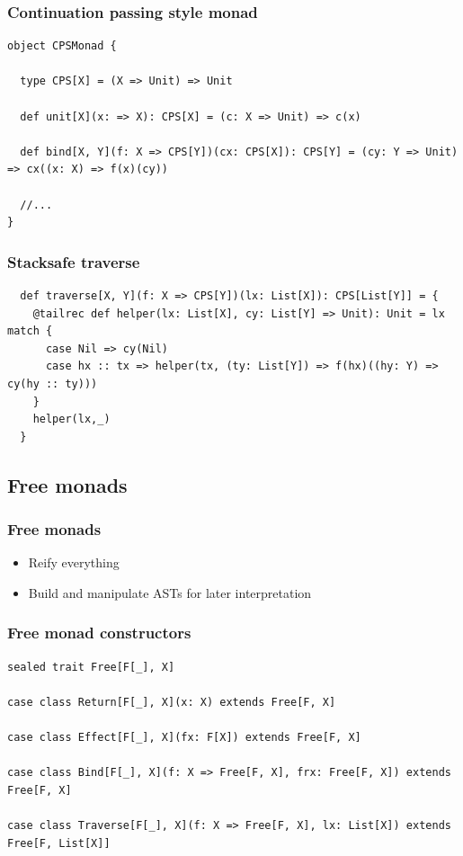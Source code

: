 \documentclass{beamer}
\begin{document}
\begin{frame}[fragile]
\frametitle{Continuation passing style monad}
\begin{lstlisting}
object CPSMonad {

  type CPS[X] = (X => Unit) => Unit

  def unit[X](x: => X): CPS[X] = (c: X => Unit) => c(x)

  def bind[X, Y](f: X => CPS[Y])(cx: CPS[X]): CPS[Y] = (cy: Y => Unit) => cx((x: X) => f(x)(cy))
  
  //...
}
\end{lstlisting}
\end{frame}
\begin{frame}[fragile]
\frametitle{Stacksafe traverse}
\begin{lstlisting}
  def traverse[X, Y](f: X => CPS[Y])(lx: List[X]): CPS[List[Y]] = {
    @tailrec def helper(lx: List[X], cy: List[Y] => Unit): Unit = lx match {
      case Nil => cy(Nil)
      case hx :: tx => helper(tx, (ty: List[Y]) => f(hx)((hy: Y) => cy(hy :: ty)))
    }
    helper(lx,_)
  }
\end{lstlisting}
\end{frame}

\subsection{Free monads}
\begin{frame}
\frametitle{Free monads}
\begin{itemize}
\item Reify everything
\item Build and manipulate ASTs for later interpretation
\end{itemize}
\end{frame}

\begin{frame}[fragile]
\frametitle{Free monad constructors}
\begin{lstlisting}
sealed trait Free[F[_], X]

case class Return[F[_], X](x: X) extends Free[F, X]

case class Effect[F[_], X](fx: F[X]) extends Free[F, X]

case class Bind[F[_], X](f: X => Free[F, X], frx: Free[F, X]) extends Free[F, X]

case class Traverse[F[_], X](f: X => Free[F, X], lx: List[X]) extends Free[F, List[X]]
\end{lstlisting}
\end{frame}
\end{document}
